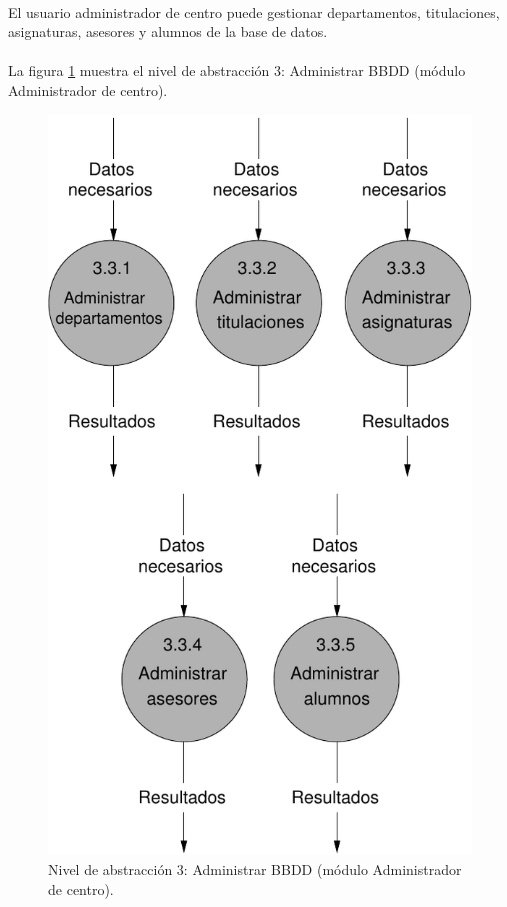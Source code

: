 \paragraph{}El usuario administrador de centro puede gestionar departamentos,
titulaciones, asignaturas, asesores y alumnos de la base de datos.

\paragraph{}La figura \ref{diagramaNivel3-AdministrarBBDD-adminCentro} muestra
el nivel de abstracción 3: Administrar BBDD (módulo Administrador de centro).

  \begin{figure}[!ht]
    \begin{center}
      \includegraphics[]{08.Analisis_Funcional/8.2.DFDs/Niveles/Nivel3/AdministradorCentro/AdministrarBBDD/Diagramas/nivel3-AdministrarBBDD.pdf}
      \caption{Nivel de abstracción 3: Administrar BBDD (módulo Administrador
      de centro).}
      \label{diagramaNivel3-AdministrarBBDD-adminCentro}
    \end{center}
  \end{figure}

